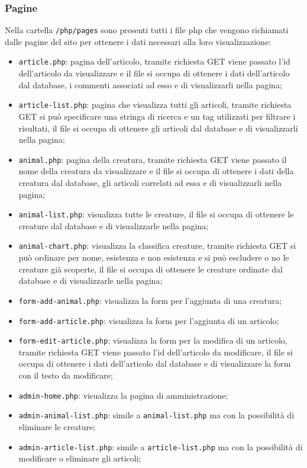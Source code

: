 \subsubsection{Pagine}
Nella cartella \texttt{/php/pages} sono presenti tutti i file php che vengono richiamati dalle pagine del sito per ottenere i dati necessari alla loro visualizzazione:
\begin{itemize}
    \item \texttt{article.php}: pagina dell'articolo, tramite richiesta GET viene passato l'id dell'articolo da visualizzare e il file si occupa di ottenere i dati dell'articolo dal database, i commenti associati ad esso e di visualizzarli nella pagina;
    \item \texttt{article-list.php}: pagina che visualizza tutti gli articoli, tramite richiesta GET si può specificare una stringa di ricerca e un tag utilizzati per filtrare i risultati, il file si occupa di ottenere gli articoli dal database e di visualizzarli nella pagina;
    \item \texttt{animal.php}: pagina della creatura, tramite richiesta GET viene passato il nome della creatura da visualizzare e il file si occupa di ottenere i dati della creatura dal database, gli articoli correlati ad essa e di visualizzarli nella pagina;
    \item \texttt{animal-list.php}: visualizza tutte le creature, il file si occupa di ottenere le creature dal database e di visualizzarle nella pagina;
    \item \texttt{animal-chart.php}: visualizza la classifica creature, tramite richiesta GET si può ordinare per nome, esistenza e non esistenza e si può escludere o no le creature già scoperte, il file si occupa di ottenere le creature ordinate dal database e di visualizzarle nella pagina;
    \item \texttt{form-add-animal.php}: visualizza la form per l'aggiunta di una creatura;
    \item \texttt{form-add-article.php}: visualizza la form per l'aggiunta di un articolo;
    \item \texttt{form-edit-article.php}: visualizza la form per la modifica di un articolo, tramite richiesta GET viene passato l'id dell'articolo da modificare, il file si occupa di ottenere i dati dell'articolo dal database e di visualizzare la form con il testo da modificare;
    \item \texttt{admin-home.php}: visualizza la pagina di amministrazione;
    \item \texttt{admin-animal-list.php}: simile a \texttt{animal-list.php} ma con la possibilità di eliminare le creature;
    \item \texttt{admin-article-list.php}: simile a \texttt{article-list.php} ma con la possibilità di modificare o eliminare gli articoli;
\end{itemize}

